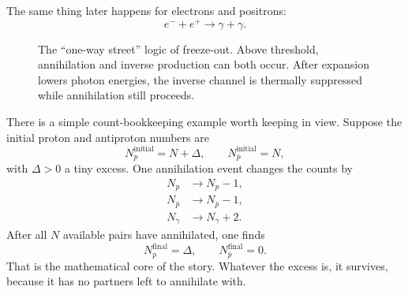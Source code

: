 The same thing later happens for electrons and positrons:
\begin{equation}
e^-+e^+ \to \gamma+\gamma.
\end{equation}

\begin{figure}[ht]
\centering
{}
\caption{The ``one-way street'' logic of freeze-out. Above threshold, annihilation and inverse production can both occur. After expansion lowers photon energies, the inverse channel is thermally suppressed while annihilation still proceeds.}
\end{figure}

There is a simple count-bookkeeping example worth keeping in view. Suppose the initial proton and antiproton numbers are
\begin{equation}
N_p^{\mathrm{initial}} = N+\Delta,
\qquad
N_{\bar p}^{\mathrm{initial}} = N,
\end{equation}
with \(\Delta>0\) a tiny excess. One annihilation event changes the counts by
\begin{align}
N_p &\to N_p-1,\\
N_{\bar p} &\to N_{\bar p}-1,\\
N_\gamma &\to N_\gamma+2.
\end{align}
After all \(N\) available pairs have annihilated, one finds
\begin{equation}
N_p^{\mathrm{final}}=\Delta,
\qquad
N_{\bar p}^{\mathrm{final}}=0.
\end{equation}
That is the mathematical core of the story. Whatever the excess is, it survives, because it has no partners left to annihilate with.

